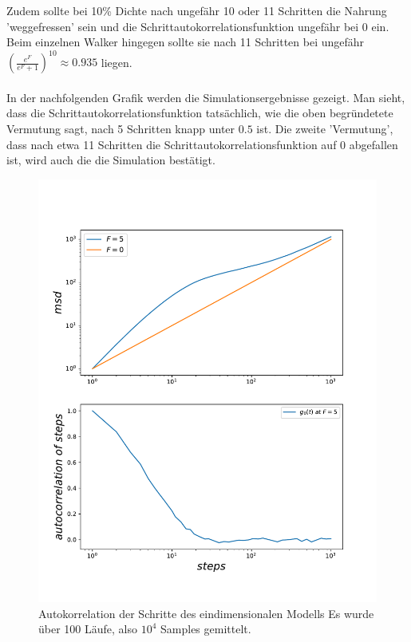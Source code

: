 \documentclass[a4paper, 12pt]{report}
\begin{document}
\noindent Zudem sollte bei 10\% Dichte nach ungefähr 10 oder 11 Schritten die Nahrung 'weggefressen' sein und die Schrittautokorrelationsfunktion ungefähr bei 0 ein. Beim einzelnen Walker hingegen sollte sie nach 11 Schritten bei ungefähr $\left(\frac{e^F}{e^F+1}\right)^{10}\approx 0.935$ liegen.
\\
\\
\noindent In der nachfolgenden Grafik werden die Simulationsergebnisse gezeigt. Man sieht, dass die Schrittautokorrelationsfunktion tatsächlich, wie die oben begründetete Vermutung sagt, nach 5 Schritten knapp unter $0.5$ ist. Die zweite 'Vermutung', dass nach etwa 11 Schritten die Schrittautokorrelationsfunktion auf 0 abgefallen ist, wird auch die die Simulation bestätigt.



\begin{figure}[H]
	\centering
	\includegraphics[scale=0.7]{onedescp.pdf}
	\caption{Autokorrelation der Schritte des eindimensionalen Modells \break Es wurde über 100 Läufe, also $10^4$ Samples gemittelt.}
\end{figure}
\end{document}
